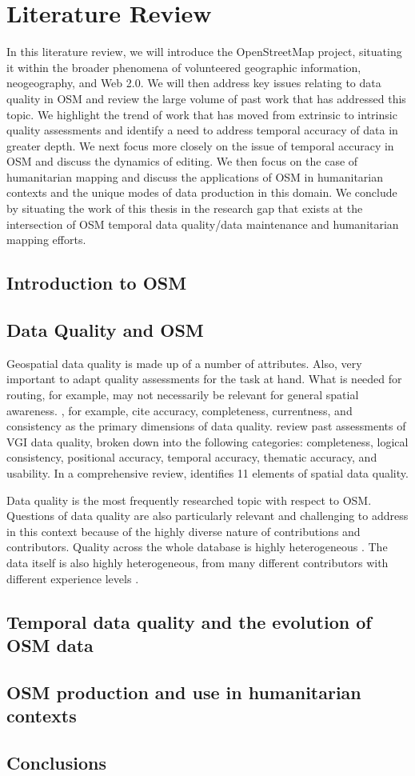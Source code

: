 \chapter{Literature Review}
\label{chapterlabel2}

In this literature review, we will introduce the OpenStreetMap project, situating it within the broader phenomena of volunteered geographic information, neogeography, and Web 2.0. We will then address key issues relating to data quality in OSM and review the large volume of past work that has addressed this topic. We highlight the trend of work that has moved from extrinsic to intrinsic quality assessments and identify a need to address temporal accuracy of data in greater depth. We next focus more closely on the issue of temporal accuracy in OSM and discuss the dynamics of editing. We then focus on the case of humanitarian mapping and discuss the applications of OSM in humanitarian contexts and the unique modes of data production in this domain. We conclude by situating the work of this thesis in the research gap that exists at the intersection of OSM temporal data quality/data maintenance and humanitarian mapping efforts. 

\section{Introduction to OSM}


\section{Data Quality and OSM}

Geospatial data quality is made up of a number of attributes. Also, very important to adapt quality assessments for the task at hand. What is needed for routing, for example, may not necessarily be relevant for general spatial awareness. \textcite{fox_notion_1994}, for example, cite accuracy, completeness, currentness, and consistency as the primary dimensions of data quality. \textcite{antoniou_measures_2015} review past assessments of VGI data quality, broken down into the following categories: completeness, logical consistency, positional accuracy, temporal accuracy, thematic accuracy, and usability. In a comprehensive review, \textcite{van_oort_spatial_2006} identifies 11 elements of spatial data quality. 

Data quality is the most frequently researched topic with respect to OSM. Questions of data quality are also particularly relevant and challenging to address in this context because of the highly diverse nature of contributions and contributors. Quality across the whole database is highly heterogeneous \parencite{grochenig_estimating_2014, haklay_how_2010, neis_analyzing_2012}. The data itself is also highly heterogeneous, from many different contributors with different experience levels \parencite{girres_quality_2010}. 

\section{Temporal data quality and the evolution of OSM data}
\section{OSM production and use in humanitarian contexts}
\section{Conclusions}

